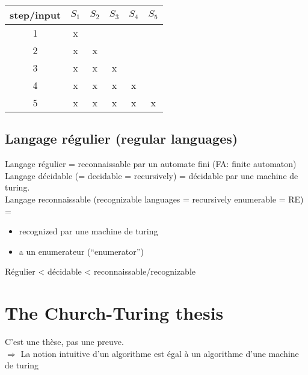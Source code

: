 \documentclass[a4paper,12pt]{article}
\begin{document}
      \begin{table}[h]
	\centering
	\begin{tabular}{c|ccccc}
	step/input & $S_1$                  & $S_2$                  & $S_3$                  & $S_4$                  & $S_5$ \\ \hline
	1          & \multicolumn{1}{c|}{x} &                        &                        &                        &       \\ \cline{3-3}
	2          & x                      & \multicolumn{1}{c|}{x} &                        &                        &       \\ \cline{4-4}
	3          & x                      & x                      & \multicolumn{1}{c|}{x} &                        &       \\ \cline{5-5}
	4          & x                      & x                      & x                      & \multicolumn{1}{c|}{x} &       \\ \cline{6-6} 
	5          & x                      & x                      & x                      & x                      & x    
	\end{tabular}
      \end{table}
      
  \subsection{Langage régulier (regular languages)}
    Langage régulier = reconnaissable par un automate fini (FA: finite automaton)\\
    Langage décidable (= decidable = recursively) = décidable par une machine de turing.\\
    Langage reconnaissable (recognizable languages = recursively enumerable = RE) =
    \begin{itemize}
      \item recognized par une machine de turing
      \item a un enumerateur (``enumerator'')
    \end{itemize}
    
    Régulier < décidable < reconnaissable/recognizable
    
    
\section{The Church-Turing thesis}
  C'est une thèse, pas une preuve.\\
  $\Rightarrow$ La notion intuitive d'un algorithme est égal à un algorithme d'une machine de turing\\
  
\end{document}
